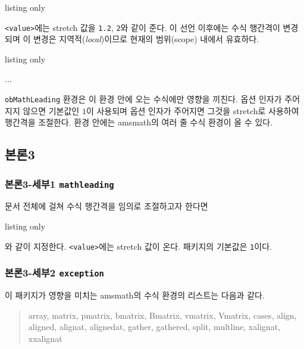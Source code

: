 \documentclass[a4paper,amsmath]{oblivoir}
\newcommand\pkg[1]{\textsf{#1}}
\begin{document}
\begin{tcblisting}{listing only}
\end{tcblisting}

\verb|<value>|에는 stretch 값을 \verb|1.2|, \verb|2|와 같이 준다. 이 선언 이후에는 수식 행간격이 변경되며 이 변경은 지역적(\emph{local})이므로
현재의 범위(scope) 내에서 유효하다.

\begin{tcblisting}{listing only}
    \begin{obMathLeading}[<value>]
        ...
    \end{obMathLeading}
\end{tcblisting}

\verb|obMathLeading| 환경은 이 환경 안에 오는 수식에만 영향을 끼친다. 옵션 인자가 주어지지 않으면
기본값인 $1$이 사용되며 옵션 인자가 주어지면 그것을 stretch로 사용하여 행간격을 조절한다.
환경 안에는 \pkg{amsmath}의 여러 줄 수식 환경이 올 수 있다.

\subsection{본론3}

\subsubsection{본론3-세부1 \texttt{mathleading}}

문서 전체에 걸쳐 수식 행간격을 임의로 조절하고자 한다면
\begin{tcblisting}{listing only}
    \usepackage[mathleading=<value>]{ob-mathleading}
\end{tcblisting}
\noindent 와 같이 지정한다. \verb|<value>|에는 stretch 값이 온다. 패키지의 기본값은 \verb|1|이다.

\subsubsection{본론3-세부2  \texttt{exception}}

이 패키지가 영향을 미치는 \pkg{amsmath}의 수식 환경의 리스트는 다음과 같다.

\begin{quote}
    \begin{ttfamily}
        array, matrix, pmatrix, bmatrix, Bmatrix, vmatrix, Vmatrix,
        cases, align, aligned, alignat, alignedat, gather, gathered,
        split, multline, xalignat, xxalignat
    \end{ttfamily}
\end{quote}
\end{document}
